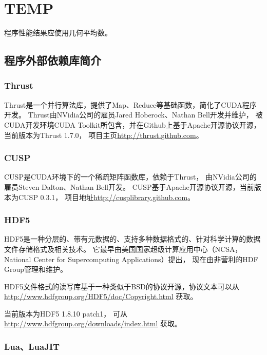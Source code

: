 
\chapter{TEMP}

程序性能结果应使用几何平均数。\cite{fleming1986not}

\section{程序外部依赖库简介}

\subsection{Thrust}

Thrust是一个并行算法库，提供了Map、Reduce等基础函数，简化了CUDA程序开发。
Thrust由NVidia公司的雇员Jared Hoberock、Nathan Bell开发并维护，
被CUDA开发环境CUDA Toolkit所包含，并在Github上基于Apache开源协议开源，
当前版本为Thrust 1.7.0，
项目主页\url{http://thrust.github.com}。

\subsection{CUSP}

CUSP是CUDA环境下的一个稀疏矩阵函数库，依赖于Thrust，
由NVidia公司的雇员Steven Dalton、Nathan Bell开发。
CUSP基于Apache开源协议开源，当前版本为CUSP 0.3.1，
项目地址\url{http://cusplibrary.github.com}。

\subsection{HDF5}

HDF5是一种分层的、带有元数据的、支持多种数据格式的、针对科学计算的数据文件存储格式及相关技术。
它最早由美国国家超级计算应用中心（NCSA， 
National Center for Supercomputing Applications）提出，
现在由非营利的HDF Group管理和维护。\cite{HDF5Wiki}

HDF5文件格式的读写库基于一种类似于BSD的协议开源，协议文本可以从
\url{http://www.hdfgroup.org/HDF5/doc/Copyright.html} 获取。

当前版本为HDF5 1.8.10 patch1，
可从\url{http://www.hdfgroup.org/downloads/index.html} 获取。

\subsection{Lua、LuaJIT }

